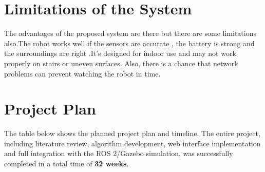 \section{Limitations of the System}
The advantages of the proposed system are there but there are some limitations also.The robot works well if the sensors are accurate , the battery is strong and the surroundings are right .It’s designed for indoor use and may not work properly on stairs or uneven surfaces.
Also, there is a chance that network problems can prevent watching the robot in time.

\section{Project Plan}
The table below shows the planned project plan and timeline. The entire project, including literature review, algorithm development, web interface implementation and full integration with the ROS 2/Gazebo simulation, was successfully completed in a total time of \textbf{32 weeks}.

